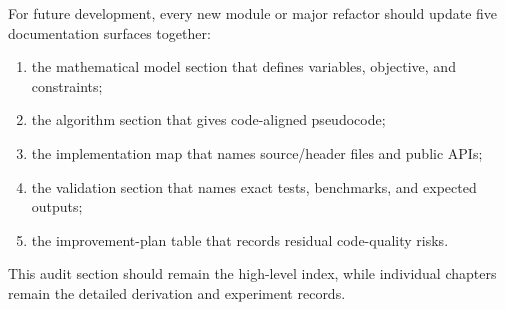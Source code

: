 For future development, every new module or major refactor should update five
documentation surfaces together:
\begin{enumerate}
  \item the mathematical model section that defines variables, objective, and constraints;
  \item the algorithm section that gives code-aligned pseudocode;
  \item the implementation map that names source/header files and public APIs;
  \item the validation section that names exact tests, benchmarks, and expected outputs;
  \item the improvement-plan table that records residual code-quality risks.
\end{enumerate}
This audit section should remain the high-level index, while individual chapters
remain the detailed derivation and experiment records.